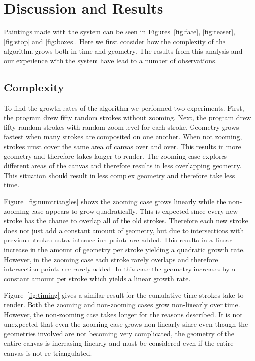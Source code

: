 \documentclass[review]{acmsiggraph}
\begin{document}
\section{Discussion and Results}
Paintings made with the system can be seen in Figures~\ref{fig:face}, \ref{fig:teaser}, \ref{fig:stop} and \ref{fig:boxes}.  Here we first consider how the complexity of the algorithm grows both in time and geometry.
The results from this analysis and our experience with the system have lead to a number of observations.

\subsection{Complexity}
To find the growth rates of the algorithm we performed two experiments. 
First, the program drew fifty random strokes without zooming.
Next, the program drew fifty random strokes with random zoom level for each stroke.
Geometry grows fastest when many strokes are composited on one another. When not zooming, strokes
must cover the same area of canvas over and over. This
results in more geometry and therefore takes longer to render. The zooming case explores different
areas of the canvas and therefore results in less overlapping geometry. This situation should result
in less complex geometry and therefore take less time.

Figure~\ref{fig:numtriangles} shows the zooming case grows linearly while the non-zooming case
appears to grow quadratically. This is expected since every new stroke has the chance to overlap
all of the old strokes. Therefore each new stroke does not just add a constant amount of geometry, but 
due to intersections with previous strokes extra intersection points are added. This results in a linear
increase in the amount of geometry per stroke yielding a quadratic growth rate. However, in the zooming case each stroke rarely overlaps and therefore
intersection points are rarely added. In this case the geometry increases by a constant amount per stroke which yields
a linear growth rate.

Figure~\ref{fig:timing} gives a similar result for the cumulative time strokes take to render. Both
the zooming and non-zooming cases grow non-linearly over time. However, the non-zooming case takes
longer for the reasons described. It is not unexpected that even the zooming case grows non-linearly
since even though the geometries involved are not becoming very complicated, the geometry of the entire
canvas is increasing linearly and must be considered even if the entire canvas is not re-triangulated.
\end{document}
